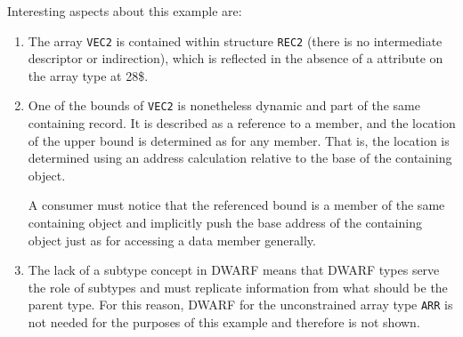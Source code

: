 Interesting aspects about this example are:
\begin{enumerate}[1. ]
\item The array \texttt{VEC2} is  contained within structure
\texttt{REC2} (there is no intermediate descriptor or indirection),
which is reflected in the absence of a \DWATdatalocation{}
attribute on the array type at 28\$.

\item One of the bounds of \texttt{VEC2} is nonetheless dynamic and part of
the same containing record. It is described as a reference to
a member, and the location of the upper bound is determined
as for any member. That is, the location is determined using
an address calculation relative to the base of the containing
object.  

A consumer must notice that the referenced bound is a
member of the same containing object and implicitly push the
base address of the containing object just as for accessing
a data member generally.

\item The lack of a subtype concept in DWARF means that DWARF types
serve the role of subtypes and must replicate information from
what should be the parent type. For this reason, DWARF for
the unconstrained array type \texttt{ARR} is not needed for the purposes
of this example and therefore is not shown.
\end{enumerate}

